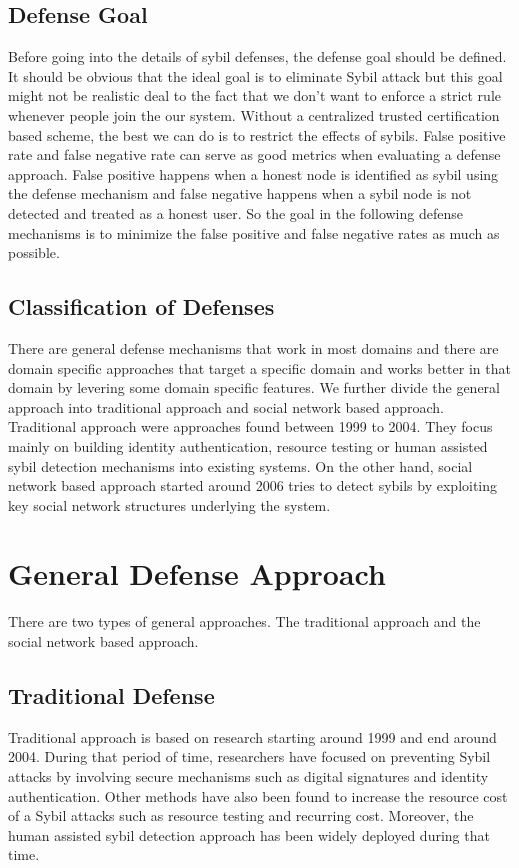 \documentclass[conference]{IEEEtran}
\begin{document}
\subsection{Defense Goal}
Before going into the details of sybil defenses, the defense goal should be defined. It should be obvious that the ideal goal is to eliminate Sybil attack
but this goal might not be realistic deal to the fact that we don't want to enforce a strict rule whenever people join the our system.
Without a centralized trusted certification based scheme, the best we can do is to restrict the effects of sybils. False positive rate and false negative rate 
can serve as good metrics when evaluating a defense approach. False positive happens when a honest node is identified as sybil using the defense mechanism and
false negative happens when a sybil node is not detected and treated as a honest user. So the goal in the following defense mechanisms is to minimize the false 
positive and false negative rates as much as possible.

\subsection{Classification of Defenses}
There are general defense mechanisms that work in most domains and there are domain specific approaches that target a specific domain and works better in that domain by levering some 
domain specific features. We further divide the general approach into traditional approach and social network based approach. 
Traditional approach were approaches found between 1999 to 2004. They focus mainly on building identity authentication, resource testing or human assisted sybil detection mechanisms
 into existing systems. On the other hand, social network based approach started around 2006 tries to detect sybils by exploiting key social network structures underlying the system.

\section{General Defense Approach} 
There are two types of general approaches. The traditional approach and the social network based approach. 

\subsection{Traditional Defense}
Traditional approach is based on research starting around 1999 and end around 2004. During that period of time, researchers have focused on preventing Sybil attacks by involving secure mechanisms such as digital signatures and identity authentication. Other methods have also been found to increase the resource cost of a Sybil attacks such as resource testing and recurring cost. Moreover, the human assisted sybil detection approach has been widely deployed during that time.
\end{document}
